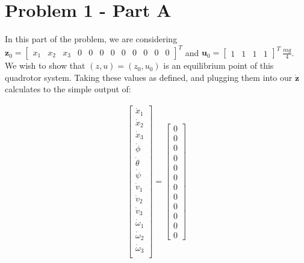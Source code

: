 \documentclass{article}
\begin{document}
\section*{Problem 1 - Part A}

In this part of the problem, we are considering $ \boldsymbol{z}_0 = \begin{bmatrix}
    x_1 & x_2 & x_3 & 0 & 0 & 0 & 0 & 0 & 0 & 0 & 0 & 0
\end{bmatrix}^T$ and $ \boldsymbol{u}_0 = \begin{bmatrix}
    1 & 1 & 1 & 1
\end{bmatrix}^T \ \frac{mg}{4}$. We wish to show that $(z, u) = (z_0, u_0)$ is an equilibrium point of this quadrotor system. Taking these values as defined, and plugging them into our $\dot{\boldsymbol{z}}$ calculates to the simple output of:

\begin{equation}
    \begin{aligned}
        \begin{bmatrix}
            \dot{x}_1 \\ \dot{x}_2 \\ \dot{x}_3 \\
            \dot{\phi} \\ \dot{\theta} \\ \dot{\psi} \\
            \dot{v}_1 \\ \dot{v}_2 \\ \dot{v}_3 \\
            \dot{\omega}_1 \\ \dot{\omega}_2 \\ \dot{\omega}_3 \\
        \end{bmatrix}
        = 
        \begin{bmatrix}
            0 \\ 0 \\ 0 \\ 0 \\ 0 \\ 0 \\ 0 \\ 0 \\ 0 \\ 0 \\ 0 \\ 0
        \end{bmatrix}
    \end{aligned}
\end{equation}
\end{document}
